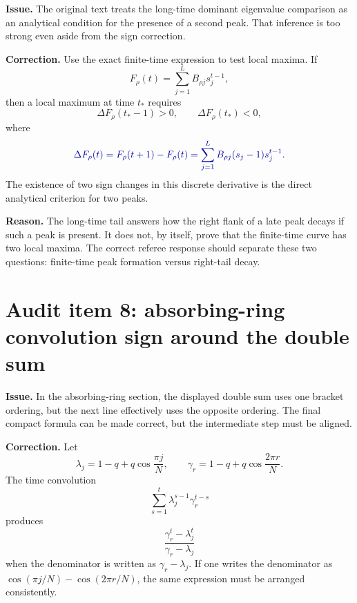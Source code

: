 \documentclass[11pt]{article}
\newcommand{\Corrected}[1]{\textcolor{blue!65!black}{#1}}
\newcommand{\Issue}[1]{\par\medskip\noindent\textbf{Issue.} #1\par}
\newcommand{\Fix}[1]{\par\noindent\textbf{Correction.} #1\par}
\newcommand{\Reason}[1]{\par\noindent\textbf{Reason.} #1\par\medskip}
\begin{document}
\Issue{The original text treats the long-time dominant eigenvalue comparison as an analytical
condition for the presence of a second peak.  That inference is too strong even aside from the sign
correction.}

\Fix{Use the exact finite-time expression to test local maxima.  If
\begin{equation}
  F_\rho(t)=\sum_{j=1}^{L}B_{\rho j}s_j^{t-1},
\end{equation}
then a local maximum at time $t_*$ requires
\begin{equation}
  \Delta F_\rho(t_*-1)>0,
  \qquad
  \Delta F_\rho(t_*)<0,
\end{equation}
where
\begin{equation}
  \Corrected{
  \Delta F_\rho(t)=F_\rho(t+1)-F_\rho(t)
  =\sum_{j=1}^{L}B_{\rho j}(s_j-1)s_j^{t-1}.}
\end{equation}
The existence of two sign changes in this discrete derivative is the direct analytical criterion
for two peaks.}

\Reason{The long-time tail answers how the right flank of a late peak decays if such a peak is
present.  It does not, by itself, prove that the finite-time curve has two local maxima.  The
correct referee response should separate these two questions: finite-time peak formation versus
right-tail decay.}

\section{Audit item 8: absorbing-ring convolution sign around the double sum}

\Issue{In the absorbing-ring section, the displayed double sum uses one bracket ordering, but the
next line effectively uses the opposite ordering.  The final compact formula can be made correct,
but the intermediate step must be aligned.}

\Fix{Let
\begin{equation}
  \lambda_j=1-q+q\cos\frac{\pi j}{N},
  \qquad
  \gamma_r=1-q+q\cos\frac{2\pi r}{N}.
\end{equation}
The time convolution
\begin{equation}
  \sum_{s=1}^{t} \lambda_j^{s-1}\gamma_r^{t-s}
\end{equation}
produces
\begin{equation}
  \frac{\gamma_r^t-\lambda_j^t}{\gamma_r-\lambda_j}
\end{equation}
when the denominator is written as $\gamma_r-\lambda_j$.  If one writes the denominator as
$\cos(\pi j/N)-\cos(2\pi r/N)$, the same expression must be arranged consistently.}
\end{document}
